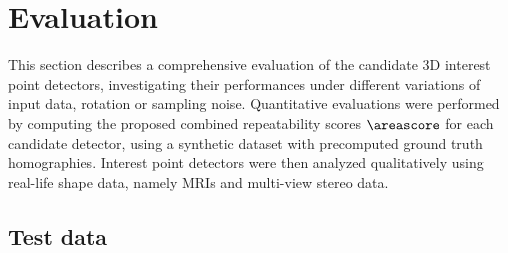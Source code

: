 \section{Evaluation}
\label{sec/eval/experiments}

This section describes a comprehensive evaluation of the candidate 3D interest point detectors, investigating their performances under different variations of input data, \eg rotation or sampling noise. Quantitative evaluations were performed by computing the proposed combined repeatability scores $\areascore$ for each candidate detector, using a synthetic dataset with precomputed ground truth homographies. Interest point detectors were then analyzed qualitatively using real-life shape data, namely MRIs and multi-view stereo data. 

\subsection{Test data}
\label{sec/eval/testdata}

